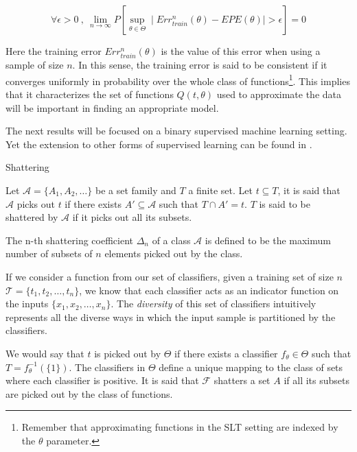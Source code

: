 \begin{equation}
\forall \epsilon > 0 \ , \ \lim_{n\to\infty} P\left[ \sup_{\theta \in \Theta} \mid Err^{n}_{train}(\theta) - EPE(\theta) \mid  > \epsilon  \right] = 0
\end{equation}

Here the training error $Err^{n}_{train}(\theta)$ is the value of this error when using a sample of size $n$. In this sense, the training error is said to be consistent if it converges uniformly in probability over the whole class of functions\footnote{Remember that approximating functions in the SLT setting are indexed by the $\theta$ parameter.}. This implies that it characterizes the set of functions $Q(t,\theta)$ used to approximate the data will be important in finding an appropriate model. %

The next results will be focused on a binary supervised machine learning setting. Yet the extension to other forms of supervised learning can be found in \textcite{cherkassky-learning2007}.

\begin{definition}{Shattering}

Let $\mathcal {A}= \{A_1,A_{2},\dots \}$ be a set family and $T$ a finite set. Let $t \subseteq T$, it is said that $\mathcal {A}$ picks out $t$ if there exists $A' \subseteq \mathcal {A} $ such that $ T \cap A' = t$. $T$ is said to be shattered by $\mathcal {A}$ if it picks out all its subsets.


\end{definition}

The n-th shattering coefficient $\Delta_n$ of a class $\mathcal {A}$ is defined to be the maximum number of subsets of $n$ elements picked out by the class.

If we consider a function from our set of classifiers, given a training set of size $n$
$\mathcal {T} = \{ t_1,t_2,\ldots,t_n \}$, we know that each classifier acts as an indicator function on the inputs $\{ x_1,x_2,\ldots,x_n \}$. The \textit{diversity} of this set of classifiers intuitively represents all the diverse ways in which the input sample is partitioned by the classifiers.

We would say that $t$ is picked out by $\Theta$ if there exists a classifier $f_{\theta} \in \Theta$ such that $T = f_{\theta}^{-1}(\{1\})$. The classifiers in $\Theta$ define a unique mapping to the class of sets where each classifier is positive. It is said that $\mathcal {F}$ shatters a set $A$ if all its subsets are picked out by the class of functions.

